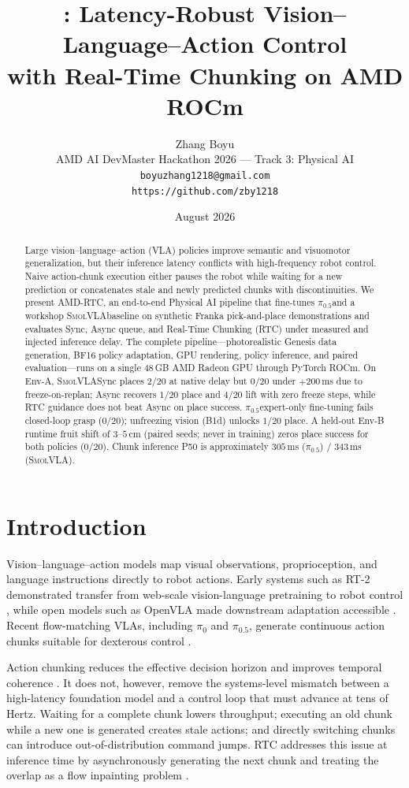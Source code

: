 \documentclass[10pt,twocolumn]{article}
\title{\method: Latency-Robust Vision--Language--Action Control\\
with Real-Time Chunking on AMD ROCm}
\author{
  Zhang Boyu\\
  AMD AI DevMaster Hackathon 2026 --- Track 3: Physical AI\\
  \texttt{boyuzhang1218@gmail.com} \\
  \texttt{https://github.com/zby1218}
}
\date{August 2026}
\newcommand{\method}{\textsc{AMD-RTC}}
\newcommand{\pifive}{$\pi_{0.5}$}
\newcommand{\smolvla}{\textsc{SmolVLA}}
\begin{document}
\maketitle

\begin{abstract}
Large vision--language--action (VLA) policies improve semantic and
visuomotor generalization, but their inference latency conflicts with
high-frequency robot control.  Naive action-chunk execution either pauses the
robot while waiting for a new prediction or concatenates stale and newly
predicted chunks with discontinuities.  We present \method, an end-to-end
Physical AI pipeline that fine-tunes \pifive and a workshop \smolvla baseline on
synthetic Franka pick-and-place demonstrations and evaluates Sync, Async
queue, and Real-Time Chunking (RTC) under measured and injected inference
delay.  The complete pipeline---photorealistic Genesis data generation, BF16
policy adaptation, GPU rendering, policy inference, and paired
evaluation---runs on a single 48\,GB AMD Radeon GPU through PyTorch ROCm.
On Env-A, \smolvla Sync places $2/20$ at native delay but $0/20$ under
$+200$\,ms due to freeze-on-replan; Async recovers $1/20$ place and $4/20$
lift with zero freeze steps, while RTC guidance does not beat Async on place
success.  \pifive expert-only fine-tuning fails closed-loop grasp ($0/20$);
unfreezing vision (B1d) unlocks $1/20$ place.  A held-out Env-B runtime
fruit shift of $3$--$5$\,cm (paired seeds; never in training) zeros place
success for both policies ($0/20$).  Chunk inference P50 is approximately
$305$\,ms (\pifive) / $343$\,ms (\smolvla).
\end{abstract}

\section{Introduction}

Vision--language--action models map visual observations, proprioception, and
language instructions directly to robot actions.  Early systems such as
RT-2 demonstrated transfer from web-scale vision-language pretraining to
robot control \cite{zitkovich2023rt2}, while open models such as OpenVLA
made downstream adaptation accessible \cite{kim2024openvla}.  Recent
flow-matching VLAs, including $\pi_0$ and \pifive, generate continuous action
chunks suitable for dexterous control \cite{black2024pi0,black2025pi05}.

Action chunking reduces the effective decision horizon and improves temporal
coherence \cite{zhao2023act}.  It does not, however, remove the systems-level
mismatch between a high-latency foundation model and a control loop that must
advance at tens of Hertz.  Waiting for a complete chunk lowers throughput;
executing an old chunk while a new one is generated creates stale actions;
and directly switching chunks can introduce out-of-distribution command
jumps.  RTC addresses this issue at inference time by asynchronously
generating the next chunk and treating the overlap as a flow inpainting
problem \cite{black2025rtc}.
\end{document}
